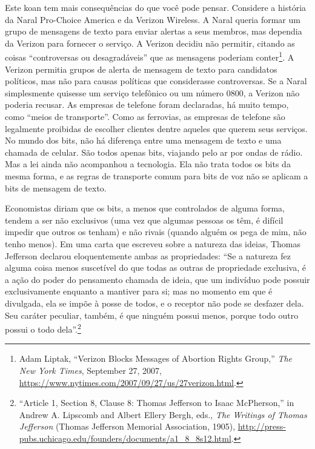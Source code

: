 Este koan tem mais consequências do que você pode pensar. Considere a história
da Naral Pro-Choice America e da Verizon Wireless. A Naral queria formar um
grupo de mensagens de texto para enviar alertas a seus membros, mas dependia da
Verizon para fornecer o serviço. A Verizon decidiu não permitir, citando as
coisas ``controversas ou desagradáveis'' que as mensagens poderiam
conter\footnote{Adam Liptak, ``Verizon Blocks Messages of Abortion Rights
Group,'' \textit{The New York Times}, September 27, 2007,
\url{https://www.nytimes.com/2007/09/27/us/27verizon.html}.}. A Verizon permitia
grupos de alerta de mensagem de texto para candidatos políticos, mas não para
causas políticas que considerasse controversas. Se a Naral simplesmente quisesse
um serviço telefônico ou um número 0800, a Verizon não poderia recusar. As
empresas de telefone foram declaradas, há muito tempo, como ``meios de
transporte''. Como as ferrovias, as empresas de
telefone são legalmente proibidas de escolher clientes dentre aqueles que querem
seus serviços. No mundo dos bits, não há diferença entre uma mensagem de texto e
uma chamada de celular. São todos apenas bits, viajando pelo ar por ondas de
rádio. Mas a lei ainda não acompanhou a tecnologia. Ela não trata todos os bits
da mesma forma, e as regras de transporte comum para bits de voz não se aplicam
a bits de mensagem de texto.

\begin{tcolorbox}[title={Exclusivos e rivais}]
Economistas diriam que os bits, a menos que controlados de alguma forma, tendem
a ser não exclusivos (uma vez que algumas pessoas os têm, é difícil impedir que
outros os tenham) e não rivais (quando alguém os pega de mim, não tenho
menos). Em uma carta que escreveu sobre a natureza das ideias, Thomas Jefferson
declarou eloquentemente ambas as propriedades: ``Se a natureza fez alguma coisa
menos suscetível do que todas as outras de propriedade exclusiva, é a ação do
poder do pensamento chamada de ideia, que um indivíduo pode possuir
exclusivamente enquanto a mantiver para si; mas no momento em que é divulgada,
ela se impõe à posse de todos, e o receptor não pode se desfazer dela. Seu
caráter peculiar, também, é que ninguém possui menos, porque todo outro possui o
todo dela''.\footnote{``Article 1, Section 8, Clause 8: Thomas Jefferson to
Isaac McPherson,'' in Andrew A. Lipscomb and Albert Ellery Bergh, eds.,
\textit{The Writings of Thomas Jefferson} (Thomas Jefferson Memorial
Association, 1905),
\url{http://press-pubs.uchicago.edu/founders/documents/a1_8_8s12.html}.}
\end{tcolorbox}

